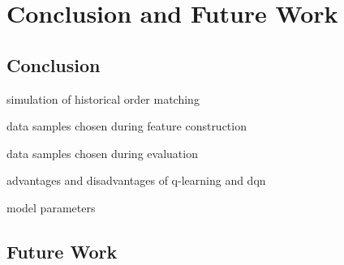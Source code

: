 \chapter{Conclusion and Future Work}
\label{chap:conclusion}

\section{Conclusion}
simulation of historical order matching

data samples chosen during feature construction

data samples chosen during evaluation

advantages and disadvantages of q-learning and dqn

model parameters

\section{Future Work}